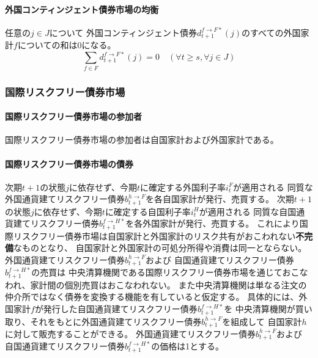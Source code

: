 \paragraph{外国コンティンジェント債券市場の均衡}
\label{sec:chapter3_assumptions_bond_markets_foreign_equilibrium}
任意の\(j\in J\)について
外国コンティンジェント債券\(d_{t+1}^{f\to F*}(j)\)のすべての外国家計\(f\)についての和は0になる。
\begin{equation}
\label{form:chapter3_assumptions_bond_markets_foreign_equilibrium}
    \sum_{f\in F}d_{t+1}^{f\to F*}(j)=0 \quad (\forall t\ge s, \forall j\in J)
\end{equation}

\subsubsection{国際リスクフリー債券市場}
\label{sec:chapter3_assumptions_bond_markets_international}

\paragraph{国際リスクフリー債券市場の参加者}
\label{sec:chapter3_assumptions_bond_markets_international_participants}
国際リスクフリー債券市場の参加者は自国家計および外国家計である。

\paragraph{国際リスクフリー債券市場の債券}
\label{sec:chapter3_assumptions_bond_markets_international_bonds}
次期\(t+1\)の状態\(j\)に依存せず、今期\(t\)に確定する外国利子率\(i_t^F\)が適用される
同質な外国通貨建てリスクフリー債券\(b_{t+1}^{h\to F}\)を各自国家計が発行、売買する。
次期\(t+1\)の状態\(j\)に依存せず、今期\(t\)に確定する自国利子率\(i_t^H\)が適用される
同質な自国通貨建てリスクフリー債券\(b_{t+1}^{f\to H*}\)を各外国家計が発行、売買する。
これにより国際リスクフリー債券市場は自国家計と外国家計のリスク共有がおこわれない\textbf{不完備}なものとなり、
自国家計と外国家計の可処分所得や消費は同一とならない。
外国通貨建てリスクフリー債券\(b_{t+1}^{h\to F}\)および
自国通貨建てリスクフリー債券\(b_{t+1}^{f\to H*}\)の売買は
中央清算機関である国際リスクフリー債券市場を通じておこなわれ、家計間の個別売買はおこなわれない。
また中央清算機関は単なる注文の仲介所ではなく債券を変換する機能を有していると仮定する。
具体的には、外国家計\(f\)が発行した自国通貨建てリスクフリー債券\(b_{t+1}^{f\to H*}\)を
中央清算機関が買い取り、それをもとに外国通貨建てリスクフリー債券\(b_{t+1}^{h\to F}\)を組成して
自国家計\(h\)に対して販売することができる。
外国通貨建てリスクフリー債券\(b_{t+1}^{h\to F}\)および
自国通貨建てリスクフリー債券\(b_{t+1}^{f\to H*}\)の価格は1とする。

